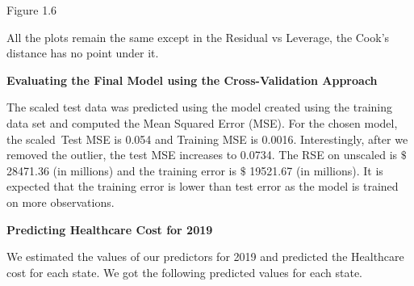 \documentclass[12pt]{article}
\begin{document}
\par

\begin{justify}
Figure 1.6
\end{justify}\par

\begin{justify}
All the plots remain the same except in the Residual vs Leverage, the Cook’s distance has no point under it.
\end{justify}\par


\vspace{\baselineskip}
\begin{adjustwidth}{0.5in}{0.0in}
\begin{justify}
\textbf{Evaluating the Final Model using the Cross-Validation Approach}
\end{justify}\par

\end{adjustwidth}

\begin{justify}
The scaled test data was predicted using the model created using the training data set and computed the Mean Squared Error (MSE). For the chosen model, the scaled\ Test MSE is 0.054 and Training MSE is 0.0016. Interestingly, after we removed the outlier, the test MSE increases to 0.0734. The RSE on unscaled is $\$$ 28471.36 (in millions) and the training error is $\$$ 19521.67 (in millions).  It is expected that the training error is lower than test error as the model is trained on more observations. 
\end{justify}\par


\vspace{\baselineskip}
\begin{adjustwidth}{1.5in}{0.0in}
\begin{justify}
\textbf{Predicting Healthcare Cost for 2019}
\end{justify}\par

\end{adjustwidth}

\begin{justify}
We estimated the values of our predictors for 2019 and predicted the Healthcare cost for each state. We got the following predicted values for each state.
\end{justify}\par
\end{document}
